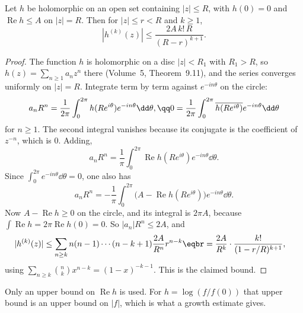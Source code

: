 \begin{lemma}\label{lem:borel}
Let $h$ be holomorphic on an open set containing $|z|\le R$, with $h(0)=0$ and $\operatorname{Re}h\le A$ on $|z|=R$. Then for $|z|\le r<R$ and $k\ge1$,
\[
|h^{(k)}(z)|\le\frac{2A\,k!\,R}{(R-r)^{k+1}}.
\]
\end{lemma}
\begin{proof}
The function $h$ is holomorphic on a disc $|z|<R_1$ with $R_1>R$, so $h(z)=\sum_{n\ge1}a_nz^n$ there (Volume~5, Theorem~9.11), and the series converges uniformly on $|z|=R$. Integrate term by term against $e^{-in\theta}$ on the circle:
\[
\begin{gathered}a_nR^n=\frac1{2\pi}\int_0^{2\pi}h(Re^{i\theta})e^{-in\theta}\dd\theta,\qq0=\frac1{2\pi}\int_0^{2\pi}\overline{h(Re^{i\theta})}e^{-in\theta}\dd\theta\end{gathered}
\]
for $n\ge1$. The second integral vanishes because its conjugate is the coefficient of $z^{-n}$, which is $0$. Adding,
\[
a_nR^n=\frac1\pi\int_0^{2\pi}\operatorname{Re}h(Re^{i\theta})e^{-in\theta}\dd\theta.
\]
Since $\int_0^{2\pi}e^{-in\theta}\dd\theta=0$, one also has
\[
a_nR^n=-\frac1\pi\int_0^{2\pi}\bigl(A-\operatorname{Re}h(Re^{i\theta})\bigr)e^{-in\theta}\dd\theta.
\]
Now $A-\operatorname{Re}h\ge0$ on the circle, and its integral is $2\pi A$, because $\int\operatorname{Re}h=2\pi\operatorname{Re}h(0)=0$. So $|a_n|R^n\le2A$, and
\[
\begin{aligned}|h^{(k)}(z)|&\le\sum_{n\ge k}n(n-1)\cdots(n-k+1)\frac{2A}{R^n}r^{n-k}\eqbr=\frac{2A}{R^k}\cdot\frac{k!}{(1-r/R)^{k+1}},\end{aligned}
\]
using $\sum_{n\ge k}\binom nkx^{n-k}=(1-x)^{-k-1}$. This is the claimed bound.
\end{proof}

Only an upper bound on $\operatorname{Re}h$ is used. For $h=\log(f/f(0))$ that upper bound is an upper bound on $|f|$, which is what a growth estimate gives.


